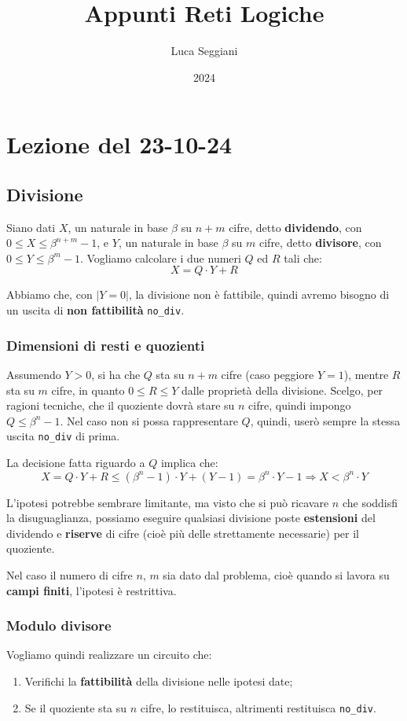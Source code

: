 \documentclass[a4paper,11pt]{article}
\title{Appunti Reti Logiche}
\author{Luca Seggiani}
\date{2024}
\begin{document}
\section{Lezione del 23-10-24}

\thispagestyle{empty}
\pagestyle{fancy}

\subsection{Divisione}
Siano dati $X$, un naturale in base $\beta$ su $n+m$ cifre, detto \textbf{dividendo}, con $0 \leq X \leq \beta^{n+m}-1$,
e $Y$, un naturale in base $\beta$ su $m$ cifre, detto \textbf{divisore}, con $0 \leq Y \leq \beta^m -1$.
Vogliamo calcolare i due numeri $Q$ ed $R$ tali che:
$$ X = Q \cdot Y + R$$

Abbiamo che, con $|Y=0|$, la divisione non è fattibile, quindi avremo bisogno di un uscita di \textbf{non fattibilità} \lstinline|no_div|.

\subsubsection{Dimensioni di resti e quozienti}
Assumendo $Y > 0$, si ha che $Q$ sta su $n+m$ cifre (caso peggiore $Y = 1$), mentre $R$ sta su $m$ cifre, in quanto $0 \leq R \leq Y$ dalle proprietà della divisione.
Scelgo, per ragioni tecniche, che il quoziente dovrà stare su $n$ cifre, quindi impongo $Q \leq \beta^n -1$.
Nel caso non si possa rappresentare $Q$, quindi, userò sempre la stessa uscita \lstinline|no_div| di prima.

La decisione fatta riguardo a $Q$ implica che:
$$ 
X = Q \cdot Y + R \leq (\beta^n - 1) \cdot Y + (Y - 1) = \beta^n \cdot Y - 1 \Rightarrow X < \beta^n \cdot Y
$$

L'ipotesi potrebbe sembrare limitante, ma visto che si può ricavare $n$ che soddisfi la disuguaglianza, possiamo eseguire qualsiasi divisione poste \textbf{estensioni} del dividendo e \textbf{riserve} di cifre (cioè più delle strettamente necessarie) per il quoziente.

Nel caso il numero di cifre $n$, $m$ sia dato dal problema, cioè quando si lavora su \textbf{campi finiti}, l'ipotesi è restrittiva.

\subsubsection{Modulo divisore}
Vogliamo quindi realizzare un circuito che:
\begin{enumerate}
	\item Verifichi la \textbf{fattibilità} della divisione nelle ipotesi date;
	\item Se il quoziente sta su $n$ cifre, lo restituisca, altrimenti restituisca \lstinline|no_div|.
\end{enumerate}
\end{document}
